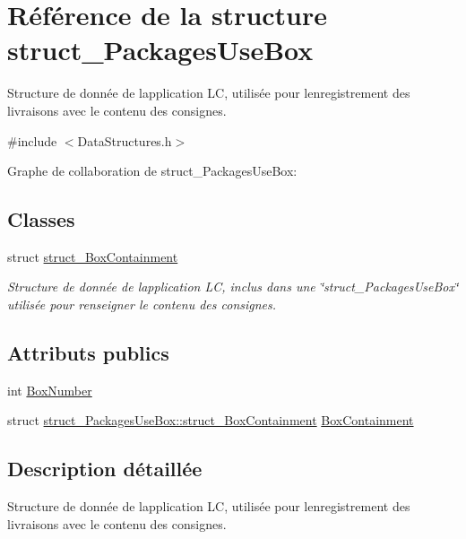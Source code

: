 \hypertarget{structstruct___packages_use_box}{}\section{Référence de la structure struct\+\_\+\+Packages\+Use\+Box}
\label{structstruct___packages_use_box}


Structure de donnée de l\textquotesingle{}application L\+C, utilisée pour l\textquotesingle{}enregistrement des livraisons avec le contenu des consignes.  




{\ttfamily \#include $<$Data\+Structures.\+h$>$}



Graphe de collaboration de struct\+\_\+\+Packages\+Use\+Box\+:
\subsection*{Classes}
\begin{DoxyCompactItemize}
\item 
struct \hyperlink{structstruct___packages_use_box_1_1struct___box_containment}{struct\+\_\+\+Box\+Containment}
\begin{DoxyCompactList}\small\item\em Structure de donnée de l\textquotesingle{}application L\+C, inclus dans une \char`\"{}struct\+\_\+\+Packages\+Use\+Box\char`\"{} utilisée pour renseigner le contenu des consignes. \end{DoxyCompactList}\end{DoxyCompactItemize}
\subsection*{Attributs publics}
\begin{DoxyCompactItemize}
\item 
int \hyperlink{structstruct___packages_use_box_a4edfedee9f32056cdce6d6908933e136}{Box\+Number}
\item 
struct \hyperlink{structstruct___packages_use_box_1_1struct___box_containment}{struct\+\_\+\+Packages\+Use\+Box\+::struct\+\_\+\+Box\+Containment} \hyperlink{structstruct___packages_use_box_acf60daf8fe7ce9e18713f0d99a8752dc}{Box\+Containment}
\end{DoxyCompactItemize}


\subsection{Description détaillée}
Structure de donnée de l\textquotesingle{}application L\+C, utilisée pour l\textquotesingle{}enregistrement des livraisons avec le contenu des consignes. 

